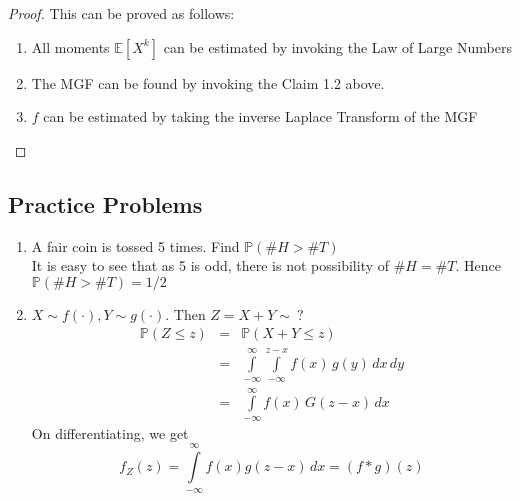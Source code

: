 \documentclass[11pt, twosides]{article}
\begin{document}
\begin{proof}
This can be proved as follows:
\begin{enumerate}
    \item All moments $\mathbb{E}[X^k]$ can be estimated by invoking the Law of Large Numbers
    \item The MGF can be found by invoking the Claim 1.2 above.
    \item $f$ can be estimated by taking the inverse Laplace Transform of the MGF
\end{enumerate}
\end{proof}

\subsection{Practice Problems}
\normalfont
\begin{enumerate}
    \item  A fair coin is tossed 5 times. Find  $\mathbb{P}(\#H > \# T)$\\
    \color{blue}It is easy to see that as 5 is odd, there is not possibility of $\#H = \#T$. Hence $\mathbb{P}(\#H > \# T) = 1/2$
    \color{black}
    \item $X \sim f(\cdot), Y \sim g(\cdot)$. Then $Z = X+Y \sim \:?$\\
    \color{blue} \begin{eqnarray*}
    \mathbb{P}(Z \leq z) &=& \mathbb{P}(X+Y \leq z)\\
                        &=& \int \limits_{-\infty}^\infty \int \limits_{-\infty}^{z-x}f(x) \, g(y) \, dx\,dy\\
                        &=& \int \limits_{-\infty}^\infty f(x)\, G(z-x) \, dx
    \end{eqnarray*}
    On differentiating, we get
    $$f_Z(z) = \int \limits_{-\infty}^\infty f(x) g(z-x)\,dx = (f * g)(z)$$
\end{enumerate}
\end{document}
